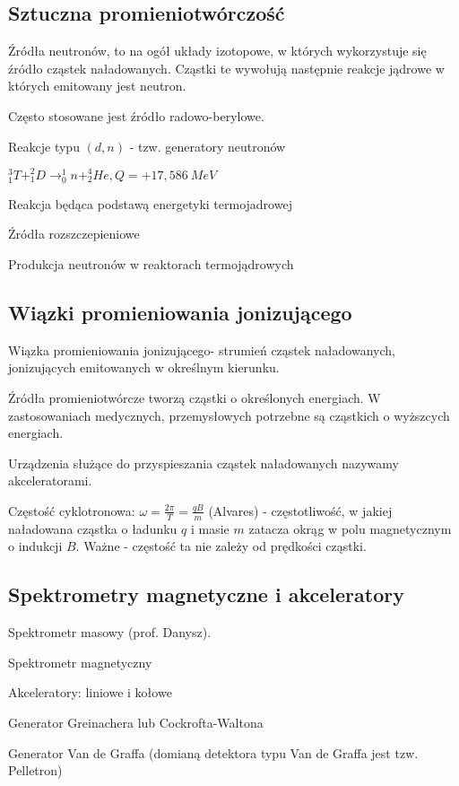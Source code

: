 \documentclass{article}
\begin{document}
\subsection{Sztuczna promieniotwórczość}

Źródła neutronów, to na ogół układy izotopowe, w których wykorzystuje się źródło cząstek naładowanych. Cząstki te wywołują następnie reakcje jądrowe w których emitowany jest neutron.

Często stosowane jest źródło radowo-berylowe.

Reakcje typu $(d,n)$ - tzw. generatory neutronów

$_1^3T + _1^2D \rightarrow _0^1n + _2^4He, Q=+17,586~MeV$

Reakcja będąca podstawą energetyki termojadrowej

Źródła rozszczepieniowe

Produkcja neutronów w reaktorach termojądrowych

\subsection{Wiązki promieniowania jonizującego}

Wiązka promieniowania jonizującego- strumień cząstek naładowanych, jonizujących emitowanych w określnym kierunku.

Źródła promieniotwórcze tworzą cząstki o określonych energiach. W zastosowaniach medycznych, przemysłowych potrzebne są cząstkich o wyższcych energiach.

Urządzenia służące do przyspieszania cząstek naładowanych nazywamy akceleratorami.

Częstość cyklotronowa: $\omega = \frac{2\pi}{T} = \frac{qB}{m}$ (Alvares) - częstotliwość, w jakiej naładowana cząstka o ładunku $q$ i masie $m$ zatacza okrąg w polu magnetycznym o indukcji $B$. Ważne - częstość ta nie zależy od prędkości cząstki.

\subsection{Spektrometry magnetyczne i akceleratory}

Spektrometr masowy (prof. Danysz).

Spektrometr magnetyczny

Akceleratory: liniowe i kołowe

Generator Greinachera lub Cockrofta-Waltona

Generator Van de Graffa (domianą detektora typu Van de Graffa jest tzw. Pelletron)
\end{document}
